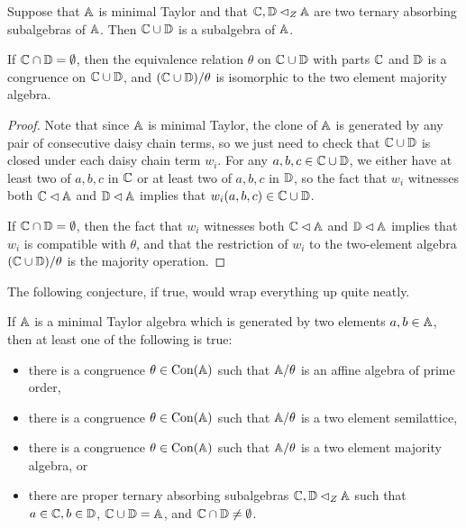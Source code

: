 \documentclass[letterpaper,11pt]{article}
\DeclareMathOperator{\Con}{Con}
\begin{document}
\begin{cor} Suppose that $\mathbb{A}$ is minimal Taylor and that $\mathbb{C}, \mathbb{D} \lhd_Z \mathbb{A}$ are two ternary absorbing subalgebras of $\mathbb{A}$. Then $\mathbb{C} \cup \mathbb{D}$ is a subalgebra of $\mathbb{A}$.

If $\mathbb{C} \cap \mathbb{D} = \emptyset$, then the equivalence relation $\theta$ on $\mathbb{C} \cup \mathbb{D}$ with parts $\mathbb{C}$ and $\mathbb{D}$ is a congruence on $\mathbb{C} \cup \mathbb{D}$, and $(\mathbb{C} \cup \mathbb{D})/\theta$ is isomorphic to the two element majority algebra.
\end{cor}
\begin{proof} Note that since $\mathbb{A}$ is minimal Taylor, the clone of $\mathbb{A}$ is generated by any pair of consecutive daisy chain terms, so we just need to check that $\mathbb{C} \cup \mathbb{D}$ is closed under each daisy chain term $w_i$. For any $a,b,c \in \mathbb{C}\cup \mathbb{D}$, we either have at least two of $a,b,c$ in $\mathbb{C}$ or at least two of $a,b,c$ in $\mathbb{D}$, so the fact that $w_i$ witnesses both $\mathbb{C} \lhd \mathbb{A}$ and $\mathbb{D} \lhd \mathbb{A}$ implies that $w_i(a,b,c) \in \mathbb{C} \cup \mathbb{D}$.

If $\mathbb{C} \cap \mathbb{D} = \emptyset$, then the fact that $w_i$ witnesses both $\mathbb{C} \lhd \mathbb{A}$ and $\mathbb{D} \lhd \mathbb{A}$ implies that $w_i$ is compatible with $\theta$, and that the restriction of $w_i$ to the two-element algebra $(\mathbb{C} \cup \mathbb{D})/\theta$ is the majority operation.
\end{proof}

The following conjecture, if true, would wrap everything up quite neatly.

\begin{conj} If $\mathbb{A}$ is a minimal Taylor algebra which is generated by two elements $a,b \in \mathbb{A}$, then at least one of the following is true:
\begin{itemize}
\item there is a congruence $\theta \in \Con(\bA)$ such that $\mathbb{A}/\theta$ is an affine algebra of prime order,
\item there is a congruence $\theta \in \Con(\bA)$ such that $\mathbb{A}/\theta$ is a two element semilattice,
\item there is a congruence $\theta \in \Con(\bA)$ such that $\mathbb{A}/\theta$ is a two element majority algebra, or
\item there are proper ternary absorbing subalgebras $\mathbb{C}, \mathbb{D} \lhd_Z \mathbb{A}$ such that $a \in \mathbb{C}, b\in \mathbb{D}$, $\mathbb{C} \cup \mathbb{D} = \mathbb{A}$, and $\mathbb{C} \cap \mathbb{D} \ne \emptyset$.
\end{itemize}
\end{conj}

\end{document}
